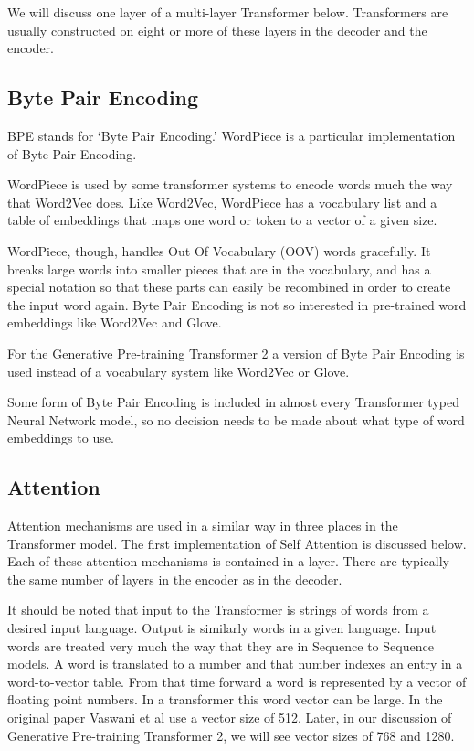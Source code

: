 We will discuss one layer of a multi-layer Transformer below. Transformers are usually constructed on eight or more of these layers in the decoder and the encoder.

\subsection{Byte Pair Encoding}

\ac{BPE} stands for `Byte Pair Encoding.' WordPiece is a particular implementation of Byte Pair Encoding.

WordPiece is used by some transformer systems to encode words much the way that Word2Vec does. Like Word2Vec, WordPiece  has a vocabulary list and a table of embeddings that maps one word or token to a vector of a given size.

WordPiece, though, handles Out Of Vocabulary (\ac{OOV}) words gracefully. It breaks large words into smaller pieces that are in the vocabulary, and has a special notation so that these parts can easily be recombined in order to create the input word again. Byte Pair Encoding is not so interested in pre-trained word embeddings like Word2Vec and Glove.

For the Generative Pre-training Transformer 2 a version of Byte Pair Encoding is used instead of a vocabulary system like Word2Vec or Glove.

Some form of Byte Pair Encoding is included in almost every Transformer typed Neural Network model, so no decision needs to be made about what type of word embeddings to use.

\subsection{Attention}
Attention mechanisms are used in a similar way in three places in the Transformer model. The first implementation of Self Attention is discussed below. Each of these attention mechanisms is contained in a layer. There are typically the same number of layers in the encoder as in the decoder.

It should be noted that input to the Transformer is strings of words from a desired input language. Output is similarly words in a given language. Input words are treated very much the way that they are in Sequence to Sequence models. A word is translated to a number and that number indexes an entry in a word-to-vector table. From that time forward a word is represented by a vector of floating point numbers. In a transformer this word vector can be large. In the original paper Vaswani et al \cite{Vaswani2017AttentionIA} use a vector size of 512. Later, in our discussion of Generative Pre-training Transformer 2, we will see vector sizes of 768 and 1280.

